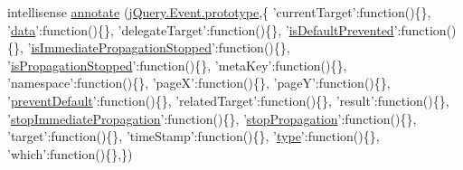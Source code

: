\begin{DoxyCompactItemize}
intellisense \hyperlink{jquery-1_810_82_8intellisense_8js_a55098c3abe028707512d17d570d3486b}{annotate} (\hyperlink{jquery-1_810_82_8js_ab5e5d0976552f788d31448ed049ae4a4}{j\-Query.\-Event.\-prototype},\{ 'current\-Target'\-:function()\{\}, '\hyperlink{jquery-1_810_82-vsdoc_8js_a609407b3456fdc3c5671a9fc4a226ff7}{data}'\-:function()\{\}, 'delegate\-Target'\-:function()\{\}, '\hyperlink{jquery-1_810_82-vsdoc_8js_af36c584d7af0deb379b8d6e3116775cc}{is\-Default\-Prevented}'\-:function()\{\}, '\hyperlink{jquery-1_810_82-vsdoc_8js_a5fe8157d3a55c7b444e8d97b9dcde6a8}{is\-Immediate\-Propagation\-Stopped}'\-:function()\{\}, '\hyperlink{jquery-1_810_82-vsdoc_8js_a67f2430529d27bb55dbfa279dc2899ea}{is\-Propagation\-Stopped}'\-:function()\{\}, 'meta\-Key'\-:function()\{\}, 'namespace'\-:function()\{\}, 'page\-X'\-:function()\{\}, 'page\-Y'\-:function()\{\}, '\hyperlink{jquery-1_810_82-vsdoc_8js_aafc4d39414b638f56c88573e5f8b4fb4}{prevent\-Default}'\-:function()\{\}, 'related\-Target'\-:function()\{\}, 'result'\-:function()\{\}, '\hyperlink{jquery-1_810_82-vsdoc_8js_a41ea733f6d1de22b59b62cac632d0180}{stop\-Immediate\-Propagation}'\-:function()\{\}, '\hyperlink{jquery-1_810_82-vsdoc_8js_ad7254bed2a2157174df61645464ed6b7}{stop\-Propagation}'\-:function()\{\}, 'target'\-:function()\{\}, 'time\-Stamp'\-:function()\{\}, '\hyperlink{jquery-1_810_82-vsdoc_8js_a3940565e83a9bfd10d95ffd27536da91}{type}'\-:function()\{\}, 'which'\-:function()\{\},\})
\item 

\end{DoxyCompactItemize}
